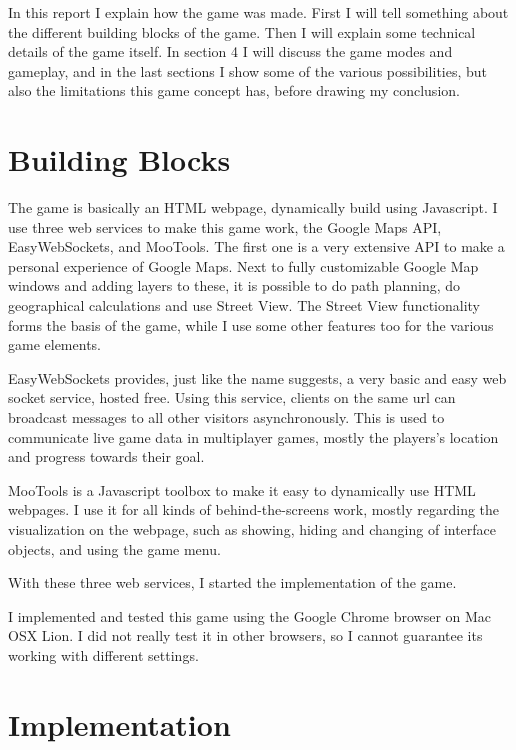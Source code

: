 \documentclass[a4paper,10pt]{article}
\begin{document}
In this report I explain how the game was made. First I will tell something about the different building blocks of the game. Then I will explain some technical details of the game itself. In section 4 I will discuss the game modes and gameplay, and in the last sections I show some of the various possibilities, but also the limitations this game concept has, before drawing my conclusion.

\section{Building Blocks} %
\label{sec:building_blocks}
The game is basically an HTML webpage, dynamically build using Javascript.
I use three web services to make this game work, the Google Maps API, EasyWebSockets, and MooTools. The first one is a very extensive API to make
a personal experience of Google Maps. Next to fully customizable Google Map windows and adding layers to these, it is possible to do path planning, do
geographical calculations and use Street View. The Street View functionality forms the basis of the game, while I use some other features too for the various game elements.

EasyWebSockets provides, just like the name suggests, a very basic and easy web socket service, hosted free. Using this service, clients on the same url can broadcast messages to all other visitors asynchronously. This is used to communicate live game data in multiplayer games, mostly the players's location and progress towards their goal.

MooTools is a Javascript toolbox to make it easy to dynamically use HTML webpages. I use it for all kinds of behind-the-screens work, mostly regarding the visualization on the webpage, such as showing, hiding and changing of interface objects, and using the game menu.

With these three web services, I started the implementation of the game.

I implemented and tested this game using the Google Chrome browser on Mac OSX Lion. I did not really test it in other browsers, so I cannot guarantee its working with different settings.

\section{Implementation} %
\label{sec:implementation}


\end{document}
